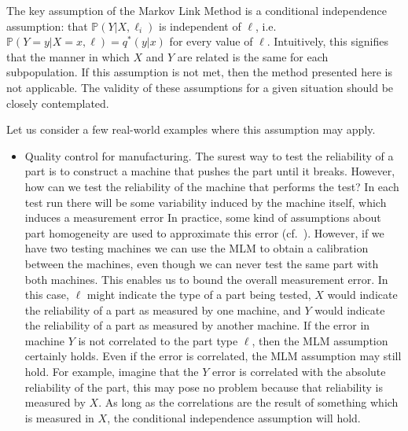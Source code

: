 The key assumption of the Markov Link Method is a conditional independence assumption: that $\mathbb{P}(Y|X,\ell_i)$ is independent of $\ell$, i.e. $\mathbb{P}(Y=y|X=x,\ell)=q^*(y|x)$ for every value of $\ell$.  Intuitively, this signifies that the manner in which $X$ and $Y$ are related is the same for each subpopulation.  If this assumption is not met, then the method presented here is not applicable.  The validity of these assumptions for a given situation should be closely contemplated.  

Let us consider a few real-world examples where this assumption may apply.

\begin{itemize}
    \item Quality control for manufacturing.   The surest way to test the reliability of a part is to construct a machine that pushes the part until it breaks.  However, how can we test the reliability of the machine that performs the test?  In each test run there will be some variability induced by the machine itself, which induces a measurement error  In practice, some kind of assumptions about part homogeneity are used to approximate this error (cf.\ \cite{de2005gauge}).  However, if we have two testing machines we can use the MLM to obtain a calibration between the machines, even though we can never test the same part with both machines.  This enables us to bound the overall measurement error.  In this case, $\ell$ might indicate the type of a part being tested, $X$ would indicate the reliability of a part as measured by one machine, and $Y$ would indicate the reliability of a part as measured by another machine.  If the error in machine $Y$ is not correlated to the part type $\ell$, then the MLM assumption certainly holds.  Even if the error is correlated, the MLM assumption may still hold.  For example, imagine that the $Y$ error is correlated with the absolute reliability of the part, this may pose no problem because that reliability is measured by $X$.  As long as the correlations are the result of something which is measured in $X$, the conditional independence assumption will hold.  


\end{itemize}
